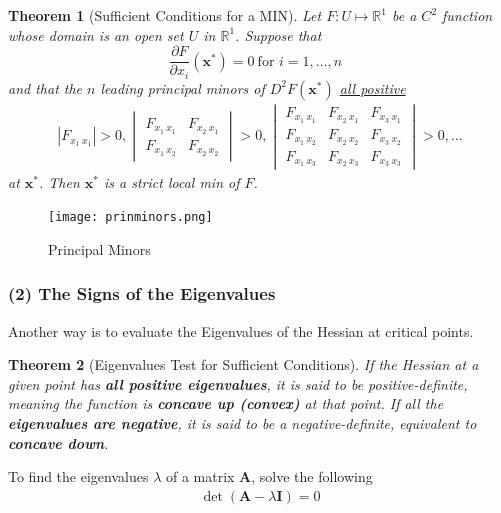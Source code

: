 \documentclass[11pt,a4paper]{book}
\newtheorem{theorem}{Theorem}[section]
\theoremstyle{definition}\newtheorem{definition}{Definition}
\theoremstyle{definition}\newtheorem{fact}{Fact}
\theoremstyle{definition}\newtheorem{remark}{Remark}
\theoremstyle{definition}\newtheorem{ex}{Ex.}
\theoremstyle{definition}\newtheorem{project}{Project}
\theoremstyle{definition}\newtheorem{problem}{Problem}
\theoremstyle{definition}\newtheorem{example}{Example}
\newenvironment{ftheorem}
{\begin{mdframed}\begin{theorem}}
		{\end{theorem}\end{mdframed}}
\numberwithin{theorem}{section}
\numberwithin{corollary}{chapter}
\numberwithin{assumption}{chapter}
\numberwithin{definition}{chapter}
\numberwithin{prop}{chapter}
\numberwithin{notation}{chapter}
\numberwithin{problem}{chapter}
\numberwithin{example}{chapter}
\numberwithin{fact}{chapter}
\numberwithin{ex}{chapter}
\def\R{\mathbb R}
\def\A{\mathbf A}
\def\R{\mathbb R}
\def\I{\mathbf I}
\def\x{\mathbf x}
\begin{document}
	\begin{ftheorem}[Sufficient Conditions for a MIN]
		Let $F: U \mapsto \R^1$ be a $C^2$ function whose domain is an open set $U$ in $\R^1$. Suppose that
		\begin{equation*}
			\frac{\partial F}{\partial x_i} (\x^*) = 0 \ \text{for $i = 1, \dots, n$ }
		\end{equation*}
		and that the $n$ leading principal minors of $D^2 F(\x^*)$ \underline{all positive}
		\begin{align*}
			|F_{x_1 \ x_1}| > 0, 
			\begin{vmatrix}
				F_{x_1 \ x_1} & F_{x_2 \ x_1} \\
				F_{x_1 \ x_2} & F_{x_2 \ x_2} 
			\end{vmatrix} > 0,
			\begin{vmatrix}
				F_{x_1 \ x_1} & F_{x_2 \ x_1} & F_{x_3 \ x_1} \\
				F_{x_1 \ x_2} & F_{x_2 \ x_2} & F_{x_3 \ x_2} \\
				F_{x_1 \ x_3} & F_{x_2 \ x_3} & F_{x_3 \ x_3} 
			\end{vmatrix} > 0, \dots
		\end{align*}
		at $\x^*$. Then $\x^*$ is a strict local min of $F$.
	\end{ftheorem}
	
	\begin{figure}[ht]
		\centering
		\texttt{[image: prinminors.png]}
		\caption{Principal Minors}
	\end{figure}
	
	\subsubsection{(2) The Signs of the Eigenvalues}
	Another way is to evaluate the Eigenvalues of the Hessian at critical points. 
	
	\begin{ftheorem}[Eigenvalues Test for Sufficient Conditions]
		If the Hessian at a given point has \textbf{all positive eigenvalues}, it is said to be positive-definite, meaning the function is \textbf{concave up (convex)} at that point. If all the \textbf{eigenvalues are negative}, it is said to be a negative-definite, equivalent to \textbf{concave down}.
	\end{ftheorem}
	
	To find the eigenvalues $\lambda$ of a matrix $\A$, solve the following
	\begin{align*}
		 \det (\A - \lambda \I) = 0      
	\end{align*}
	
\end{document}

